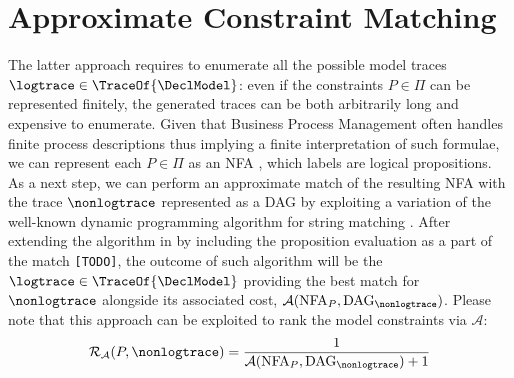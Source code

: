 \section{Approximate Constraint Matching}
The latter approach requires to enumerate all the possible model traces $\logtrace\in\TraceOf{\DeclModel}$: even if the constraints $P\in\Pi$ can be represented finitely, the generated traces can be both arbitrarily long and expensive to enumerate. Given that Business Process Management often handles finite process descriptions \cite{GiacomoV13} thus implying a finite interpretation of such formulae, we can represent each $P\in\Pi$ as an NFA \cite{GiacomoMM14}, which labels are logical propositions. As a next step, we can perform an approximate match of the resulting NFA with the trace $\nonlogtrace$ represented as a DAG \cite{Myers1989} by exploiting a variation of the well-known dynamic programming algorithm for string matching \cite{GALIL198833}. After extending the algorithm in \cite{Myers1989} by including the proposition evaluation as a part of the match \texttt{\color{red}[TODO]}, the outcome of such algorithm will be the $\logtrace\in\TraceOf{\DeclModel}$ providing the best match for $\nonlogtrace$ alongside its associated cost, $\mathcal{A}(\textup{NFA}_{P},\textup{DAG}_{\nonlogtrace})$. 
Please note that this approach can be exploited to rank the model constraints via $\mathcal{A}$:
\[\mathcal{R}_{\mathcal{A}}(P,\nonlogtrace)=\frac{1}{\mathcal{A}(\textup{NFA}_{P},\textup{DAG}_{\nonlogtrace})+1}\]